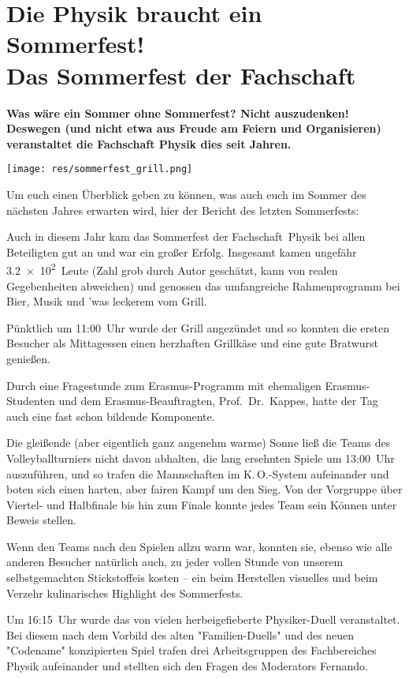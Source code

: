 \section[Das Sommerfest der Fachschaft]{Die Physik braucht ein Sommerfest!\\Das Sommerfest der Fachschaft}
\begin{multicols*}{2}

\textbf{Was wäre ein Sommer ohne Sommerfest?
	Nicht auszudenken!
	Deswegen (und nicht etwa aus Freude am Feiern und Organisieren) veranstaltet die Fachschaft Physik dies seit Jahren.}

\texttt{[image: res/sommerfest\_grill.png]}

Um euch einen Überblick geben zu können, was auch euch im Sommer des nächsten Jahres erwarten wird, hier der Bericht des letzten Sommerfests:

Auch in diesem Jahr kam das Sommerfest der Fachschaft~Physik bei allen Beteiligten gut an und war ein großer Erfolg.
Insgesamt kamen ungefähr \num{3,2e2}~Leute (Zahl grob durch Autor geschätzt, kann von realen Gegebenheiten abweichen) und genossen das umfangreiche Rahmenprogramm bei Bier, Musik und 'was leckerem vom Grill.

Pünktlich um 11:00~Uhr wurde der Grill angezündet und so konnten die ersten Besucher als Mittagessen einen herzhaften Grillkäse und eine gute Bratwurst genießen.

Durch eine Fragestunde zum Erasmus-Programm mit ehemaligen Erasmus-Studenten und dem Erasmus-Beauftragten, Prof.\ Dr.\ Kappes, hatte der Tag auch eine fast schon bildende Komponente.

Die gleißende (aber eigentlich ganz angenehm warme) Sonne ließ die Teams des Volleyballturniers nicht davon abhalten, die lang ersehnten Spiele um 13:00~Uhr auszuführen, und so trafen die Mannschaften im K.\,O.-System aufeinander und boten sich einen harten, aber fairen Kampf um den Sieg.
Von der Vorgruppe über Viertel- und Halbfinale bis hin zum Finale konnte jedes Team sein Können unter Beweis stellen.

Wenn den Teams nach den Spielen allzu warm war, konnten sie, ebenso wie alle anderen Besucher natürlich auch, zu jeder vollen Stunde von unserem selbstgemachten Stickstoffeis kosten -- ein beim Herstellen visuelles und beim Verzehr kulinarisches Highlight des Sommerfests. 

Um 16:15~Uhr wurde das von vielen herbeigefieberte Physiker-Duell veranstaltet.
Bei diesem nach dem Vorbild des alten "Familien-Duells" und des neuen "Codename" konzipierten Spiel trafen drei Arbeitsgruppen des Fachbereiches Physik aufeinander und stellten sich den Fragen des Moderators Fernando.


\end{multicols*}
